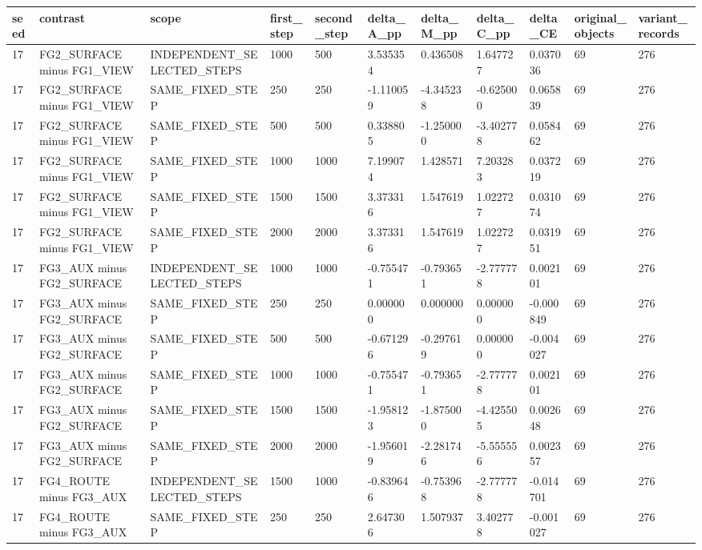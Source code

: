 \begin{tabular}{lllllllllll}
\toprule
seed & contrast & scope & first\_step & second\_step & delta\_A\_pp & delta\_M\_pp & delta\_C\_pp & delta\_CE & original\_objects & variant\_records \\
\midrule
17 & FG2\_SURFACE minus FG1\_VIEW & INDEPENDENT\_SELECTED\_STEPS & 1000 & 500 & 3.535354 & 0.436508 & 1.647727 & 0.037036 & 69 & 276 \\
17 & FG2\_SURFACE minus FG1\_VIEW & SAME\_FIXED\_STEP & 250 & 250 & -1.110059 & -4.345238 & -0.625000 & 0.065839 & 69 & 276 \\
17 & FG2\_SURFACE minus FG1\_VIEW & SAME\_FIXED\_STEP & 500 & 500 & 0.338805 & -1.250000 & -3.402778 & 0.058462 & 69 & 276 \\
17 & FG2\_SURFACE minus FG1\_VIEW & SAME\_FIXED\_STEP & 1000 & 1000 & 7.199074 & 1.428571 & 7.203283 & 0.037219 & 69 & 276 \\
17 & FG2\_SURFACE minus FG1\_VIEW & SAME\_FIXED\_STEP & 1500 & 1500 & 3.373316 & 1.547619 & 1.022727 & 0.031074 & 69 & 276 \\
17 & FG2\_SURFACE minus FG1\_VIEW & SAME\_FIXED\_STEP & 2000 & 2000 & 3.373316 & 1.547619 & 1.022727 & 0.031951 & 69 & 276 \\
17 & FG3\_AUX minus FG2\_SURFACE & INDEPENDENT\_SELECTED\_STEPS & 1000 & 1000 & -0.755471 & -0.793651 & -2.777778 & 0.002101 & 69 & 276 \\
17 & FG3\_AUX minus FG2\_SURFACE & SAME\_FIXED\_STEP & 250 & 250 & 0.000000 & 0.000000 & 0.000000 & -0.000849 & 69 & 276 \\
17 & FG3\_AUX minus FG2\_SURFACE & SAME\_FIXED\_STEP & 500 & 500 & -0.671296 & -0.297619 & 0.000000 & -0.004027 & 69 & 276 \\
17 & FG3\_AUX minus FG2\_SURFACE & SAME\_FIXED\_STEP & 1000 & 1000 & -0.755471 & -0.793651 & -2.777778 & 0.002101 & 69 & 276 \\
17 & FG3\_AUX minus FG2\_SURFACE & SAME\_FIXED\_STEP & 1500 & 1500 & -1.958123 & -1.875000 & -4.425505 & 0.002648 & 69 & 276 \\
17 & FG3\_AUX minus FG2\_SURFACE & SAME\_FIXED\_STEP & 2000 & 2000 & -1.956019 & -2.281746 & -5.555556 & 0.002357 & 69 & 276 \\
17 & FG4\_ROUTE minus FG3\_AUX & INDEPENDENT\_SELECTED\_STEPS & 1500 & 1000 & -0.839646 & -0.753968 & -2.777778 & -0.014701 & 69 & 276 \\
17 & FG4\_ROUTE minus FG3\_AUX & SAME\_FIXED\_STEP & 250 & 250 & 2.647306 & 1.507937 & 3.402778 & -0.001027 & 69 & 276 \\

\end{tabular}

